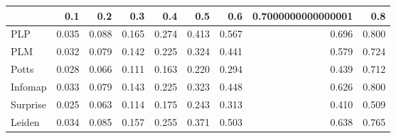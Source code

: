 \begin{tabular}{lrrrrrrrr}
\toprule
{} &   0.1 &   0.2 &   0.3 &   0.4 &   0.5 &   0.6 & 0.7000000000000001 &   0.8 \\
\midrule
PLP      & 0.035 & 0.088 & 0.165 & 0.274 & 0.413 & 0.567 &              0.696 & 0.800 \\
PLM      & 0.032 & 0.079 & 0.142 & 0.225 & 0.324 & 0.441 &              0.579 & 0.724 \\
Potts    & 0.028 & 0.066 & 0.111 & 0.163 & 0.220 & 0.294 &              0.439 & 0.712 \\
Infomap  & 0.033 & 0.079 & 0.143 & 0.225 & 0.323 & 0.448 &              0.626 & 0.800 \\
Surprise & 0.025 & 0.063 & 0.114 & 0.175 & 0.243 & 0.313 &              0.410 & 0.509 \\
Leiden   & 0.034 & 0.085 & 0.157 & 0.255 & 0.371 & 0.503 &              0.638 & 0.765 \\
\bottomrule
\end{tabular}
